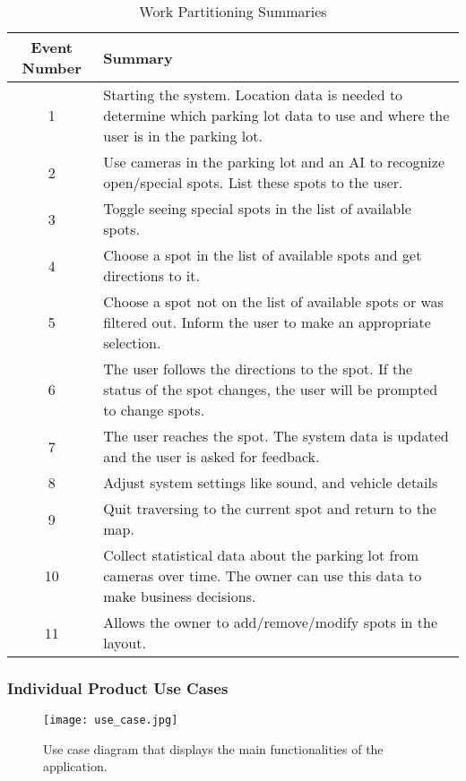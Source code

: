 \documentclass[12pt,letterpaper]{article}
\begin{document}
\begin{table}[h]
\caption{Work Partitioning Summaries}
    \centering
    \begin{tabular}{|c|p{10cm}|}
    \hline
    \textbf{Event Number} & \textbf{Summary} \\
    \hline
    1 & Starting the system. Location data is needed to determine which parking lot data to use and where the user is in the parking lot.\\
    \hline
    2 & Use cameras in the parking lot and an AI to recognize open/special spots. List these spots to the user.\\
    \hline
    3 & Toggle seeing special spots in the list of available spots.\\
    \hline
    4 & Choose a spot in the list of available spots and get directions to it.\\
    \hline
    5 & Choose a spot not on the list of available spots or was filtered out. Inform the user to make an appropriate selection.\\
    \hline
    6 & The user follows the directions to the spot. If the status of the spot changes, the user will be prompted to change spots.\\
    \hline
    7 & The user reaches the spot. The system data is updated and the user is asked for feedback.\\
    \hline
    8 & Adjust system settings like sound, and vehicle details\\
    \hline
    9 & Quit traversing to the current spot and return to the map.\\
    \hline
    10 & Collect statistical data about the parking lot from cameras over time. The owner can use this data to make business decisions.\\
    \hline
    11 & Allows the owner to add/remove/modify spots in the layout.\\
    \hline
    \end{tabular}
\end{table}

\newpage
\subsubsection{Individual Product Use Cases}

\begin{figure}[H]
    \centering
    \texttt{[image: use\_case.jpg]}
    \caption{Use case diagram that displays the main functionalities of the application.}
\end{figure}
\end{document}
